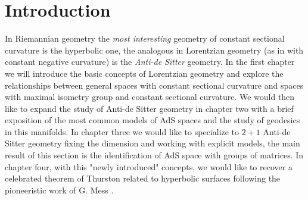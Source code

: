 \chapter{Introduction}

In Riemannian geometry the \textit{most interesting} geometry of constant sectional curvature is the hyperbolic one, the analogous in Lorentzian geometry  (as in with constant negative curvature) is the \textit{Anti-de Sitter} geometry. In the first chapter we will introduce the basic concepts of Lorentzian geometry and explore the relationships between general spaces with constant sectional curvature and spaces with maximal isometry group and constant sectional curvature.
We would then like to expand the study of Anti-de Sitter geometry in chapter two with a brief exposition of the most common models of AdS spaces and the study of geodesics in this manifolds. 
In chapter three we would like to specialize to $2+1$ Anti-de Sitter geometry fixing the dimension and working with explicit models, the main result of this section is the identification of AdS space with groups of matrices. 
In chapter four, with this "newly introduced" concepts, we would like to recover a celebrated theorem of Thurston related to hyperbolic surfaces following the pioneeristic work of G. Mess \cite{Mess}.